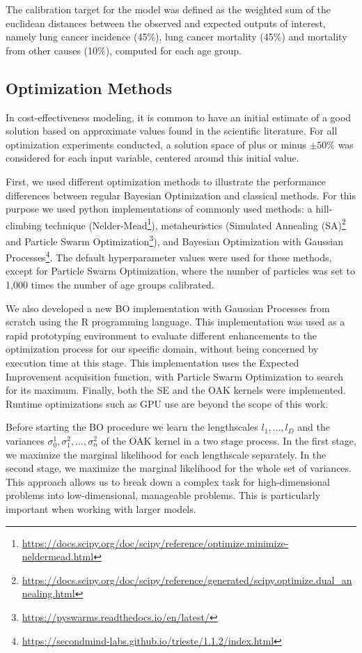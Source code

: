 \documentclass{IOS-Book-Article}
\begin{document}
	The calibration target for the model was defined as the weighted sum of the euclidean distances between the observed and expected outputs of interest, namely lung cancer incidence (45\%), lung cancer mortality (45\%) and mortality from other causes (10\%), computed for each age group.
	
	\subsection{Optimization Methods}
	In cost-effectiveness modeling, it is common to have an initial estimate of a good solution based on approximate values found in the scientific literature. For all optimization experiments conducted, a solution space of plus or minus $\pm 50\%$ was considered for each input variable, centered around this initial value.
	
	First, we used different optimization methods to illustrate the performance differences between regular Bayesian Optimization and classical methods. For this purpose we used python implementations of commonly used methods: a hill-climbing technique (Nelder-Mead\footnote{\url{https://docs.scipy.org/doc/scipy/reference/optimize.minimize-neldermead.html}}\cite{nelder-mead}), metaheuristics (Simulated Annealing (SA)\footnote{\url{https://docs.scipy.org/doc/scipy/reference/generated/scipy.optimize.dual_annealing.html}}\cite{simulated-annealing} and Particle Swarm Optimization\footnote{\url{https://pyswarms.readthedocs.io/en/latest/}}\cite{pso}), and Bayesian Optimization with Gaussian Processes\footnote{\url{https://secondmind-labs.github.io/trieste/1.1.2/index.html}}. The default hyperparameter values were used for these methods, except for Particle Swarm Optimization, where the number of particles was set to 1,000 times the number of age groups calibrated.
	
	We also developed a new BO implementation with Gaussian Processes from scratch using the R programming language. This implementation was used as a rapid prototyping environment to evaluate different enhancements to the optimization process for our specific domain, without being concerned by execution time at this stage. This implementation uses the Expected Improvement acquisition function, with Particle Swarm Optimization to search for its maximum. Finally, both the SE and the OAK kernels were implemented. Runtime optimizations such as GPU use are beyond the scope of this work.
	
	Before starting the BO procedure we learn the lengthscales $l_1, ..., l_D$ and the variances $\sigma_0^1, \sigma_1^2, ..., \sigma_n^2$ of the OAK kernel in a two stage process. In the first stage, we maximize the marginal likelihood for each lengthscale separately. In the second stage, we maximize the marginal likelihood for the whole set of variances. This approach allows us to break down a complex task for high-dimensional problems into low-dimensional, manageable problems. This is particularly important when working with larger models.
	
\end{document}

